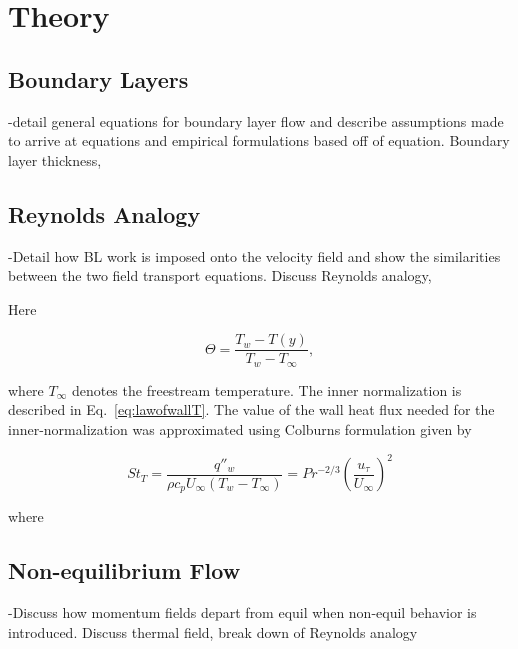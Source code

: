 \chapter{Theory}

\section{Boundary Layers}
-detail general equations for boundary layer flow and describe assumptions made to arrive at equations and empirical formulations based off of equation.
Boundary layer thickness, \\

\section{Reynolds Analogy}
-Detail how BL work is imposed onto the velocity field and show the similarities between the two field transport equations.
Discuss Reynolds analogy, \\

Here 

\begin{equation}
\Theta = \frac{T_w - T(y)}{T_w - T_\infty},
\end{equation}

\noindent where $T_\infty$ denotes the freestream temperature. The inner normalization is described in Eq.~\ref{eq:lawofwallT}. The value of the wall heat flux needed for the inner-normalization was approximated using Colburns formulation given by 

\begin{equation}
St_T = \frac{q''_w}{\rho c_p U_\infty (T_{w} - T_\infty)} = Pr^{-2/3} \left(\frac{u_\tau}{U_\infty}\right)^2 
\label{eq:qw}
\end{equation}

\noindent where 

\section{Non-equilibrium Flow}
-Discuss how momentum fields depart from equil when non-equil behavior is introduced.
Discuss thermal field, break down of Reynolds analogy\\

